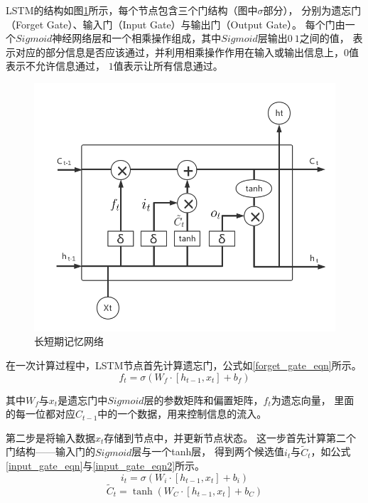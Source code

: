 LSTM的结构如图\ref{LSTM}所示，每个节点包含三个门结构（图中$\sigma $部分），
分别为遗忘门（Forget Gate）、输入门（Input Gate）与输出门（Output Gate）。
每个门由一个$Sigmoid$神经网络层和一个相乘操作组成，其中$Sigmoid$层输出$0~1$之间的值，
表示对应的部分信息是否应该通过，并利用相乘操作作用在输入或输出信息上，$0$值表示不允许信息通过，
$1$值表示让所有信息通过。
\begin{figure}[h]
    \includegraphics[scale=0.5]{picture/LSTM.png}
    \caption{长短期记忆网络}
    \label{LSTM}
\end{figure}
在一次计算过程中，LSTM节点首先计算遗忘门，公式如\ref{forget_gate_eqn}所示。
\begin{equation}
    f_t=\sigma\left ( W_f \cdot [h_{t-1},x_t]+b_f \right )
    \label{forget_gate_eqn}
\end{equation}

其中$W_f$与$x_t$是遗忘门中$Sigmoid$层的参数矩阵和偏置矩阵，$f_t$为遗忘向量，
里面的每一位都对应$C_{t-1}$中的一个数据，用来控制信息的流入。

第二步是将输入数据$x_t$存储到节点中，并更新节点状态。
这一步首先计算第二个门结构——输入门的$Sigmoid$层与一个tanh层，
得到两个候选值$i_t$与$\tilde{C}_t$，如公式\ref{input_gate_eqn}与\ref{input_gate_eqn2}所示。
\begin{equation}
    i_t=\sigma\left ( W_i \cdot [h_{t-1},x_t]+b_i \right )
    \label{input_gate_eqn}
\end{equation}
\begin{equation}
    \tilde{C}_t=\tanh\left ( W_C \cdot [h_{t-1},x_t]+b_C \right )
    \label{input_gate_eqn2}
\end{equation}

